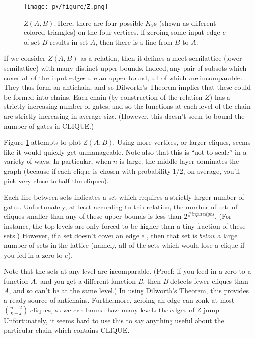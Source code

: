 \documentclass[12pt]{article}
\theoremstyle{definition}
\begin{document}
\begin{figure}
\centering
\texttt{[image: py/figure/Z.png]}
\caption{$Z(A,B).$ Here, there are four possible $K_3$s
(shown as different-colored triangles) on the four vertices.
If zeroing some input edge $e$ of set $B$ results in set $A$, then
there is a line from $B$ to $A$.
}

\label{fig:Z}
\end{figure}

If we consider $Z(A, B)$ as a relation, then it defines a meet-semilattice
(lower semilattice) with 
many distinct upper bounds.  Indeed, any pair of subsets which
cover all of the input edges are an upper bound, all of which
are incomparable. They thus form an antichain, and so Dilworth's Theorem
implies that these could be formed into chains. Each chain (by construction
of the relation $Z$) has a strictly increasing number of gates, and so the
functions at each level of the chain are strictly increasing in average
size. (However, this doesn't seem to bound the number of gates in CLIQUE.)

Figure \ref{fig:Z} attempts to plot $Z(A,B)$. Using more vertices, or
larger cliques, seems like it would quickly get unmanageable.
Note also that this is ``not to scale'' in a variety of ways. In
particular, when $n$ is large, the middle layer dominates the graph
(because if each clique is chosen with probability 1/2, on average,
you'll pick very close to half the cliques).

Each line between sets indicates a set which requires a strictly larger number of gates.  Unfortunately, at least according to this relation,
the number of sets of cliques smaller than
any of these upper bounds is less than $2^{\# input edges}$.
(For instance, the top levels are only forced to be higher than
a tiny fraction of these sets.) However, if a set doesn't cover an edge $e$ ,
then that set is {\em below} a large number of sets in the lattice (namely,
all of the sets which would lose a clique if you fed in a zero to $e$).

Note that the sets at any level are incomparable. (Proof: if you feed in
a zero to a function $A$, and you get a different function $B$, then $B$
detects fewer cliques than $A$, and so can't be at the same level.)
In using Dilworth's Theorem, this provides a ready source of antichains.
Furthermore, zeroing an edge
can zonk at most ${n-2} \choose {k-2}$ cliques, so we can bound how
many levels the edges of $Z$ jump. Unfortunately, it seems hard to use
this to say anything useful about the particular chain which contains CLIQUE.
\end{document}
